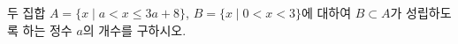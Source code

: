 두 집합 $A=\{x \mid a<x\le 3a+8\}$, $B=\{x \mid 0<x<3\}$에 대하여 $B\subset A$가 성립하도록 하는 정수 $a$의 개수를 구하시오.
